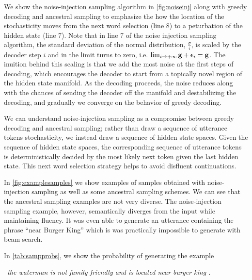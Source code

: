 We show the noise-injection sampling algorithm in \autoref{fig:noiseinj}
along with greedy decoding and ancestral sampling to emphasize the 
how the location of the stochasticity moves from the next word selection (line 8) to a peturbation of the hidden state (line 7). 
Note that in line 7 of the noise injection sampling algorithm, the standard
deviation of the normal distribution, $\frac{\sigma}{i}$, is scaled by the 
decoder step $i$ and in the limit turns to zero, i.e. $\lim_{i \rightarrow +\infty} \mathbf{g} + \boldsymbol{\epsilon}_i = \mathbf{g}$. The inuition 
behind this scaling is that we add the most noise at the first steps 
of decoding, which encourages the decoder to start from a topically novel
region of the hidden state manifold. As the decoding proceeds, the noise
reduces along with the chances of sending the decoder off the manifold
and destabilizing the decoding, and gradually we converge on the behavior of
greedy decoding. 


We can understand noise-injection sampling as a compromise between
greedy decoding and ancestral sampling; rather than draw a sequence of utterance
tokens stochasticity, we instead draw a sequence of hidden state spaces.
Given the sequence of hidden state spaces, the corresponding sequence of
utterance tokens is deterministically decided by the most likely next token
given the last hidden state. This next word selection strategy helps to
avoid disfluent continuations.




In \autoref{fig:examplesamples} we show examples of samples obtained with
noise-injection sampling as well as some ancestral sampling schemes.
We can see that the ancestral sampling examples are not very diverse.
The noise-injection sampling
example, however, semantically diverges from the input while maintaining
fluency. It was even able to generate an utterance containing the phrase
``near Burger King'' which is was practically impossible to generate with
beam search.




In \autoref{tab:sampprobs}, we show the probability of generating the 
example

\begin{center}
\textit{\starttok~the waterman is not family friendly and is located near burger king . \stoptok}\end{center}

